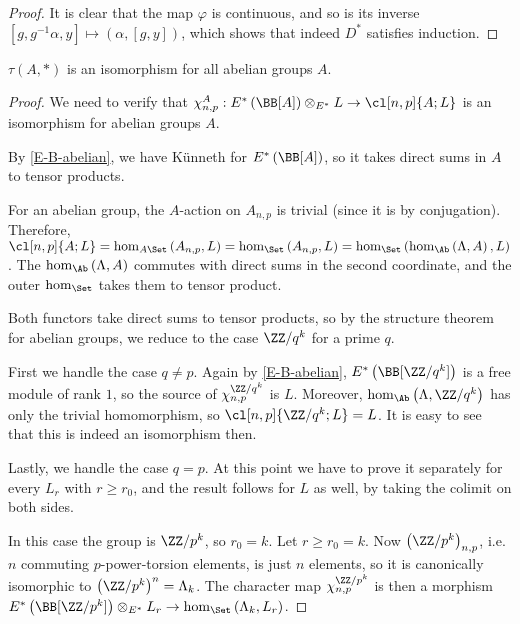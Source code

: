 \begin{proof}
	It is clear that the map $\varphi$ is continuous, and so is its inverse $\left[g, g^{-1} \alpha, y\right] \mapsto \left(\alpha, \left[g, y\right]\right)$, which shows that indeed $D^*$ satisfies induction.
\end{proof}

\begin{lemma}
	$\tau\left(A, *\right)$ is an isomorphism for all abelian groups $A$.
\end{lemma}

\begin{proof}
	We need to verify that
	$
	\chi_{n,p}^A:
	E^*\left(\BB[A]\right) \otimes_{E^*} L
	\to \cl[n,p]{A; L}
	$
	is an isomorphism for abelian groups $A$.
	
	By \cref{E-B-abelian}, we have K\"unneth for $E^*\left(\BB[A]\right)$, so it takes direct sums in $A$ to tensor products.
	
	For an abelian group, the $A$-action on $A_{n,p}$ is trivial (since it is by conjugation).
	Therefore,
	$
	\cl[n,p]{A; L}
	= \hom_{A\Set}\left(A_{n,p}, L\right)
	= \hom_{\Set}\left(A_{n,p}, L\right)
	= \hom_{\Set}\left(\hom_{\Ab}\left(\Lambda, A\right), L\right)
	$.
	The $\hom_{\Ab}\left(\Lambda, A\right)$ commutes with direct sums in the second coordinate, and the outer $\hom_{\Set}$ takes them to tensor product.
	
	Both functors take direct sums to tensor products, so by the structure theorem for abelian groups, we reduce to the case $\ZZ/q^k$ for a prime $q$.
	
	First we handle the case $q \neq p$.
	Again by \cref{E-B-abelian}, $E^*\left(\BB[\ZZ/q^k]\right)$ is a free module of rank $1$, so the source of $\chi_{n,p}^{\ZZ/q^k}$ is $L$.
	Moreover, $\hom_{\Ab}\left(\Lambda, \ZZ/q^k\right)$ has only the trivial homomorphism, so $\cl[n,p]{\ZZ/q^k; L} = L$.
	It is easy to see that this is indeed an isomorphism then.
	
	Lastly, we handle the case $q = p$.
	At this point we have to prove it separately for every $L_r$ with $r \geq r_0$, and the result follows for $L$ as well, by taking the colimit on both sides.
	
	In this case the group is $\ZZ/p^k$, so $r_0 = k$.
	Let $r \geq r_0 = k$.
	Now $\left(\ZZ/p^k\right)_{n,p}$, i.e. $n$ commuting $p$-power-torsion elements, is just $n$ elements, so it is canonically isomorphic to $\left(\ZZ/p^k\right)^n = \Lambda_k$.
	The character map $\chi_{n,p}^{\ZZ/p^k}$ is then a morphism $E^*\left(\BB[\ZZ/p^k]\right) \otimes_{E^*} L_r \to \hom_{\Set}\left(\Lambda_k, L_r\right)$.
	

\end{proof}
